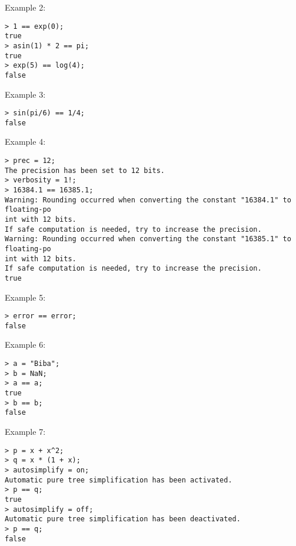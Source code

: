 \noindent Example 2: 
\begin{center}\begin{minipage}{15cm}\begin{Verbatim}[frame=single]
> 1 == exp(0);
true
> asin(1) * 2 == pi;
true
> exp(5) == log(4);
false
\end{Verbatim}
\end{minipage}\end{center}
\noindent Example 3: 
\begin{center}\begin{minipage}{15cm}\begin{Verbatim}[frame=single]
> sin(pi/6) == 1/4;
false
\end{Verbatim}
\end{minipage}\end{center}
\noindent Example 4: 
\begin{center}\begin{minipage}{15cm}\begin{Verbatim}[frame=single]
> prec = 12;
The precision has been set to 12 bits.
> verbosity = 1!;
> 16384.1 == 16385.1;
Warning: Rounding occurred when converting the constant "16384.1" to floating-po
int with 12 bits.
If safe computation is needed, try to increase the precision.
Warning: Rounding occurred when converting the constant "16385.1" to floating-po
int with 12 bits.
If safe computation is needed, try to increase the precision.
true
\end{Verbatim}
\end{minipage}\end{center}
\noindent Example 5: 
\begin{center}\begin{minipage}{15cm}\begin{Verbatim}[frame=single]
> error == error;
false
\end{Verbatim}
\end{minipage}\end{center}
\noindent Example 6: 
\begin{center}\begin{minipage}{15cm}\begin{Verbatim}[frame=single]
> a = "Biba";
> b = NaN;
> a == a;
true
> b == b;
false
\end{Verbatim}
\end{minipage}\end{center}
\noindent Example 7: 
\begin{center}\begin{minipage}{15cm}\begin{Verbatim}[frame=single]
> p = x + x^2;
> q = x * (1 + x);
> autosimplify = on;
Automatic pure tree simplification has been activated.
> p == q;
true
> autosimplify = off;
Automatic pure tree simplification has been deactivated.
> p == q;
false
\end{Verbatim}
\end{minipage}\end{center}
